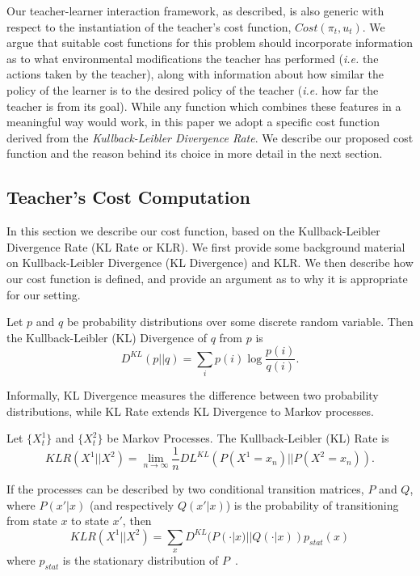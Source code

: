 Our teacher-learner interaction framework, as described, is also
generic with respect to the instantiation of the teacher's cost
function, $Cost(\pi_t,u_t)$. We argue that suitable cost functions for
this problem should incorporate information as to what environmental
modifications the teacher has performed (\emph{i.e.} the actions taken
by the teacher), along with information about how similar the policy
of the learner is to the desired policy of the teacher (\emph{i.e.}
how far the teacher is from its goal). While any function which
combines these features in a meaningful way would work, in this paper
we adopt a specific cost function derived from the
\emph{Kullback-Leibler Divergence Rate}.  We describe our proposed
cost function and the reason behind its
choice in more
detail in the next section.

\subsection{Teacher's Cost Computation}\label{sec:KLCost}
\noindent
In this section we describe our cost function, based on the
Kullback-Leibler Divergence Rate (KL Rate or KLR).  We first provide some
background material on Kullback-Leibler Divergence (KL Divergence) and
KLR. We then describe how our cost function is defined, and provide an
argument as to why it is appropriate for our setting.


\begin{Definition}
Let $p$ and $q$ be probability distributions over some discrete random
variable. Then the Kullback-Leibler (KL) Divergence of $q$ from $p$ is
\[
D^{KL}(p||q)=\sum_i p(i)\log \frac{p(i)}{q(i)}.
\]
\end{Definition}

\noindent Informally, KL Divergence measures the difference between
two probability distributions, while KL Rate extends KL
Divergence to Markov processes.
\begin{Definition}
Let $\{X^1_t\}$ and $\{X^2_t\}$ be Markov Processes.  The
Kullback-Leibler (KL) Rate is
\[
KLR(X^1||X^2)=\lim_{n\rightarrow \infty} \frac{1}{n}DL^{KL}(P(X^1=x_n)||P(X^2=x_n)).
\]
\end{Definition}
If the processes can be described by two conditional transition
matrices, $P$ and $Q$, where $P(x'|x)$ (and respectively $Q(x'|x)$) is
the probability of transitioning from state $x$ to state $x'$, then
\[
KLR(X^1||X^2)=\sum_{x} D^{KL}(P(\cdot|x)||Q(\cdot|x))p_{stat}(x)
\]
where $p_{stat}$ is the stationary distribution of
$P$~\cite{rached_alajaji_campbell_2004}.


